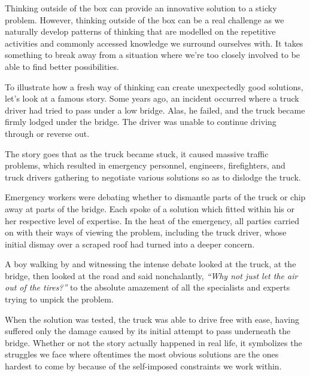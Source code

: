\begin{tcolorbox}[
	width=\textwidth,
	title={\textbf{A Design Thinking Problem Solving Example}},
	outer arc=0mm,
	arc=0mm,
	boxrule=1pt,
	]    
Thinking outside of the box can provide an innovative solution to a sticky problem. However, thinking outside of the box can be a real challenge as we naturally develop patterns of thinking that are modelled on the repetitive activities and commonly accessed knowledge we surround ourselves with. It takes something to break away from a situation where we’re too closely involved to be able to find better possibilities. 
\par \vspace{0.5em}
To illustrate how a fresh way of thinking can create unexpectedly good solutions, let’s look at a famous story. Some years ago, an incident occurred where a truck driver had tried to pass under a low bridge. Alas, he failed, and the truck became firmly lodged under the bridge. The driver was unable to continue driving through or reverse out.
\par \vspace{0.5em}
The story goes that as the truck became stuck, it caused massive traffic problems, which resulted in emergency personnel, engineers, firefighters, and truck drivers gathering to negotiate various solutions so as to dislodge the truck.
\par \vspace{0.5em}
Emergency workers were debating whether to dismantle parts of the truck or chip away at parts of the bridge. Each spoke of a solution which fitted within his or her respective level of expertise. In the heat of the emergency, all parties carried on with their ways of viewing the problem, including the truck driver, whose initial dismay over a scraped roof had turned into a deeper concern.
\par \vspace{0.5em}
A boy walking by and witnessing the intense debate looked at the truck, at the bridge, then looked at the road and said nonchalantly, \emph{``Why not just let the air out of the tires?''} to the absolute amazement of all the specialists and experts trying to unpick the problem.
\par \vspace{0.5em}
When the solution was tested, the truck was able to drive free with ease, having suffered only the damage caused by its initial attempt to pass underneath the bridge. Whether or not the story actually happened in real life, it symbolizes the struggles we face where oftentimes the most obvious solutions are the ones hardest to come by because of the self-imposed constraints we work within.
\end{tcolorbox}   

